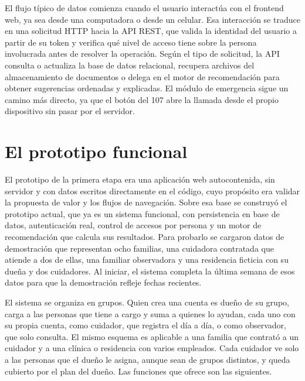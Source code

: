 El flujo típico de datos comienza cuando el usuario interactúa con el frontend web, ya sea desde una computadora o desde un celular. Esa interacción se traduce en una solicitud HTTP hacia la API REST, que valida la identidad del usuario a partir de su token y verifica qué nivel de acceso tiene sobre la persona involucrada antes de resolver la operación. Según el tipo de solicitud, la API consulta o actualiza la base de datos relacional, recupera archivos del almacenamiento de documentos o delega en el motor de recomendación para obtener sugerencias ordenadas y explicadas. El módulo de emergencia sigue un camino más directo, ya que el botón del 107 abre la llamada desde el propio dispositivo sin pasar por el servidor.

\section{El prototipo funcional}

El prototipo de la primera etapa era una aplicación web autocontenida, sin servidor y con datos escritos directamente en el código, cuyo propósito era validar la propuesta de valor y los flujos de navegación. Sobre esa base se construyó el prototipo actual, que ya es un sistema funcional, con persistencia en base de datos, autenticación real, control de accesos por persona y un motor de recomendación que calcula sus resultados. Para probarlo se cargaron datos de demostración que representan ocho familias, una cuidadora contratada que atiende a dos de ellas, una familiar observadora y una residencia ficticia con su dueña y dos cuidadores. Al iniciar, el sistema completa la última semana de esos datos para que la demostración refleje fechas recientes.

El sistema se organiza en grupos. Quien crea una cuenta es dueño de su grupo, carga a las personas que tiene a cargo y suma a quienes lo ayudan, cada uno con su propia cuenta, como cuidador, que registra el día a día, o como observador, que solo consulta. El mismo esquema es aplicable a una familia que contrató a un cuidador y a una clínica o residencia con varios empleados. Cada cuidador ve solo a las personas que el dueño le asigna, aunque sean de grupos distintos, y queda cubierto por el plan del dueño. Las funciones que ofrece son las siguientes.

